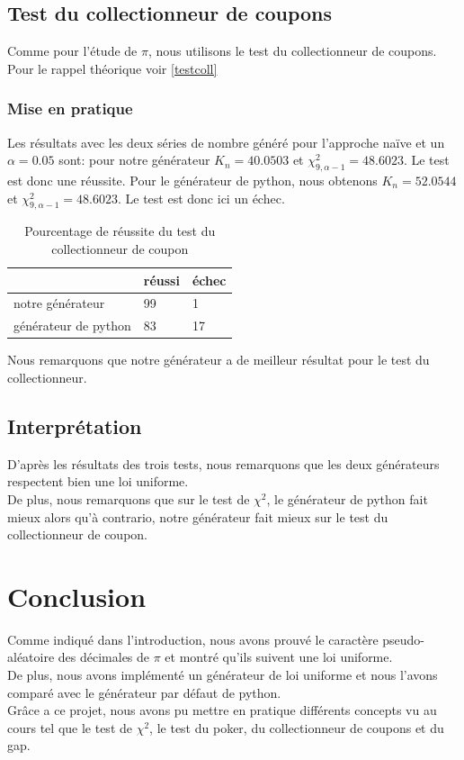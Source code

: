 \documentclass[french]{article}
\begin{document}
\subsection{Test du collectionneur de coupons}
Comme pour l'étude de $\pi$, nous utilisons le test du collectionneur de coupons. Pour le rappel théorique voir \ref{testcoll}
\subsubsection{Mise en pratique}
Les résultats avec les deux séries de nombre généré pour l'approche naïve et un $\alpha=0.05$ sont: pour notre générateur  $K_n =40.0503$ et $\chi^{2}_{9,\alpha-1} = 48.6023$. Le test est donc une réussite.
Pour le générateur de python, nous obtenons $K_n =52.0544$ et $\chi^{2}_{9,\alpha-1} = 48.6023$. Le test est donc ici un échec.\\

\begin{table}[!h]
\centering
\caption{Pourcentage de réussite du test du collectionneur de coupon }
\label{pourcentgap}
\begin{tabular}{l|l|l|}
\cline{2-3}
                                           & réussi & échec \\ \hline
\multicolumn{1}{|l|}{notre générateur}     & 99     & 1    \\ \hline
\multicolumn{1}{|l|}{générateur de python} & 83     & 17     \\ \hline
\end{tabular}
\end{table}
Nous remarquons que notre générateur a de meilleur résultat pour le test du collectionneur.
\subsection{Interprétation}
D'après les résultats des trois tests, nous remarquons que les deux générateurs  respectent bien une loi uniforme. \\De plus, nous remarquons que sur le test de  $\chi^2$, le générateur de python fait mieux alors qu'à contrario, notre générateur fait mieux sur le test du collectionneur de coupon.

\section{Conclusion}
Comme indiqué dans l'introduction, nous avons prouvé le caractère pseudo-aléatoire des décimales de $\pi$ et montré qu'ils suivent une loi uniforme.\\
De plus, nous avons implémenté un générateur de loi uniforme et nous l'avons comparé avec le générateur par défaut de python.\\
Grâce a ce projet, nous avons pu mettre en pratique différents concepts vu au cours tel que le test de $\chi^2$, le test du poker, du collectionneur de coupons et du gap.
\end{document}
